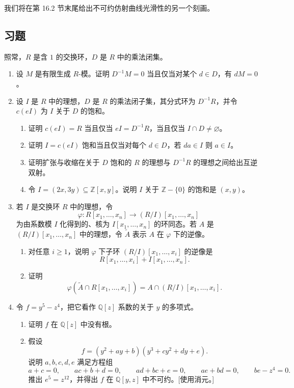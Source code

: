 我们将在第 16.2 节末尾给出不可约仿射曲线光滑性的另一个刻画。

\subsection*{习题}

照常，$R$ 是含 $1$ 的交换环，$D$ 是 $R$ 中的乘法闭集。
\begin{enumerate}[label=\arabic*.]
	\item 设 $M$ 是有限生成 $R$-模。证明 $D^{-1}M=0$ 当且仅当对某个 $d\in D$，有 $dM=0$。
	
	\item 设 $I$ 是 $R$ 中的理想，$D$ 是 $R$ 的乘法闭子集，其分式环为 $D^{-1}R$，并令 $c(eI)$ 为 $I$ 关于 $D$ 的饱和。
	\begin{enumerate}[label=(\alph*)]
		\item 证明 $c(eI)=R$ 当且仅当 $eI=D^{-1}R$，当且仅当 $I\cap D\ne\varnothing$。
		\item 证明 $I=c(eI)$ 饱和当且仅当对每个 $d\in D$，若 $da\in I$ 则 $a\in I$。
		\item 证明扩张与收缩在关于 $D$ 饱和的 $R$ 的理想与 $D^{-1}R$ 的理想之间给出互逆双射。
		\item 令 $I=(2x,3y)\subseteq\mathbb Z[x,y]$。说明 $I$ 关于 $\mathbb Z-\{0\}$ 的饱和是 $(x,y)$。
	\end{enumerate}
	
	\item 若 $I$ 是交换环 $R$ 中的理想，令
	\[
	\varphi:R[x_1,\ldots,x_n]\longrightarrow (R/I)[x_1,\ldots,x_n]
	\]
	为由系数模 $I$ 化得到的、核为 $I[x_1,\ldots,x_n]$ 的环同态。若 $A$ 是 $(R/I)[x_1,\ldots,x_n]$ 中的理想，令 $\widetilde A$ 表示 $A$ 在 $\varphi$ 下的逆像。
	\begin{enumerate}[label=(\alph*)]
		\item 对任意 $i\ge1$，说明 $\varphi$ 下子环 $(R/I)[x_1,\ldots,x_i]$ 的逆像是
		\[
		R[x_1,\ldots,x_i]+I[x_1,\ldots,x_n].
		\]
		\item 证明
		\[
		\varphi(\widetilde A\cap R[x_1,\ldots,x_i])=A\cap (R/I)[x_1,\ldots,x_i].
		\]
	\end{enumerate}
	
	\item 令 $f=y^5-z^4$，把它看作 $\mathbb Q[z]$ 系数的关于 $y$ 的多项式。
	\begin{enumerate}[label=(\alph*)]
		\item 证明 $f$ 在 $\mathbb Q[z]$ 中没有根。
		\item 假设
		\[
		f=(y^2+ay+b)(y^3+cy^2+dy+e).
		\]
		说明 $a,b,c,d,e$ 满足方程组
		\[
		a+c=0,
		\qquad
		ac+b+d=0,
		\qquad
		ad+bc+e=0,
		\qquad
		ae+bd=0,
		\qquad
		be-z^4=0.
		\]
		推出 $e^5=z^{12}$，并得出 $f$ 在 $\mathbb Q[y,z]$ 中不可约。[使用消元。]
	\end{enumerate}
	

\end{enumerate}
